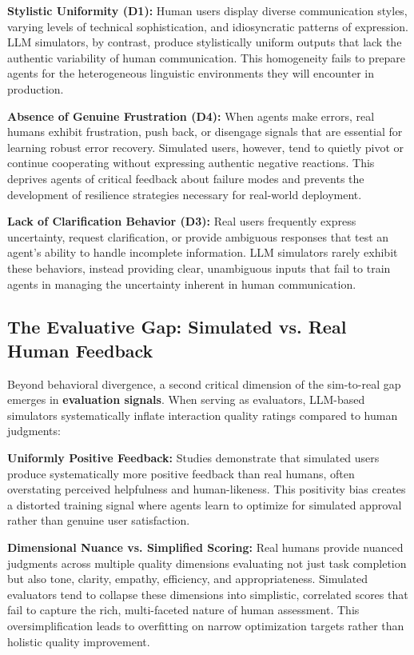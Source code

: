 \textbf{Stylistic Uniformity (D1):} Human users display diverse communication styles, varying levels of technical sophistication, and idiosyncratic patterns of expression. LLM simulators, by contrast, produce stylistically uniform outputs that lack the authentic variability of human communication. This homogeneity fails to prepare agents for the heterogeneous linguistic environments they will encounter in production.

\textbf{Absence of Genuine Frustration (D4):} When agents make errors, real humans exhibit frustration, push back, or disengage signals that are essential for learning robust error recovery. Simulated users, however, tend to quietly pivot or continue cooperating without expressing authentic negative reactions. This deprives agents of critical feedback about failure modes and prevents the development of resilience strategies necessary for real-world deployment.

\textbf{Lack of Clarification Behavior (D3):} Real users frequently express uncertainty, request clarification, or provide ambiguous responses that test an agent's ability to handle incomplete information. LLM simulators rarely exhibit these behaviors, instead providing clear, unambiguous inputs that fail to train agents in managing the uncertainty inherent in human communication.

\subsection{The Evaluative Gap: Simulated vs. Real Human Feedback}

Beyond behavioral divergence, a second critical dimension of the sim-to-real gap emerges in \textbf{evaluation signals}. When serving as evaluators, LLM-based simulators systematically inflate interaction quality ratings compared to human judgments:

\textbf{Uniformly Positive Feedback:} Studies demonstrate that simulated users produce systematically more positive feedback than real humans, often overstating perceived helpfulness and human-likeness. This positivity bias creates a distorted training signal where agents learn to optimize for simulated approval rather than genuine user satisfaction.

\textbf{Dimensional Nuance vs. Simplified Scoring:} Real humans provide nuanced judgments across multiple quality dimensions evaluating not just task completion but also tone, clarity, empathy, efficiency, and appropriateness. Simulated evaluators tend to collapse these dimensions into simplistic, correlated scores that fail to capture the rich, multi-faceted nature of human assessment. This oversimplification leads to overfitting on narrow optimization targets rather than holistic quality improvement.

